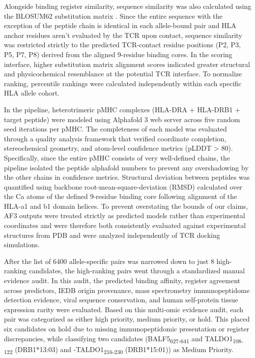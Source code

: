 \documentclass[11pt]{article}
\begin{document}
Alongside binding register similarity, sequence similarity was also calculated using the BLOSUM62 substitution matrix \cite{blosum}. Since the entire sequence with the exception of the peptide chain is identical in each allele-bound pair and HLA anchor residues aren’t evaluated by the TCR upon contact, sequence similarity was restricted strictly to the predicted TCR-contact residue positions (P2, P3, P5, P7, P8) derived from the aligned 9-residue binding cores. In the scoring interface, higher substitution matrix alignment scores indicated greater structural and physicochemical resemblance at the potential TCR interface. To normalize ranking, percentile rankings were calculated independently within each specific HLA allele cohort.

In the pipeline, heterotrimeric pMHC complexes (HLA-DRA + HLA-DRB1 + target peptide) were modeled using Alphafold 3 web server \cite{af3} across five random seed iterations per pMHC. The completeness of each model was evaluated through a quality analysis framework that verified coordinate completion, stereochemical geometry, and atom-level confidence metrics (pLDDT > 80). Specifically, since the entire pMHC consists of very well-defined chains, the pipeline isolated the peptide alphafold numbers to prevent any overshadowing by the other chains in confidence metrics. Structural deviation between peptides was quantified using backbone root-mean-square-deviation (RMSD) calculated over the Ca atoms of the defined 9-residue binding core following alignment of the HLA-a1 and b1 domain helices. To prevent overstating the bounds of our claims, AF3 outputs were treated strictly as predicted models rather than experimental coordinates and were therefore both consistently evaluated against experimental structures from PDB and were analyzed independently of TCR docking simulations.

After the list of 6400 allele-specific pairs was narrowed down to just 8 high-ranking candidates, the high-ranking pairs went through a standardized manual evidence audit. In this audit, the predicted binding affinity, register agreement across predictors, IEDB origin provenance, mass spectrometry immunopeptidome detection evidence, viral sequence conservation, and human self-protein tissue expression rarity were evaluated. Based on this multi-omic evidence audit, each pair was categorized as either high priority, medium priority, or hold. This placed six candidates on hold due to missing immunopeptidomic presentation or register discrepancies, while classifying two candidates (BALF5\textsubscript{627-641} and TALDO1\textsubscript{108-122} (DRB1*13:03) and -TALDO1\textsubscript{216-230} (DRB1*15:01)) as Medium Priority.
\end{document}
